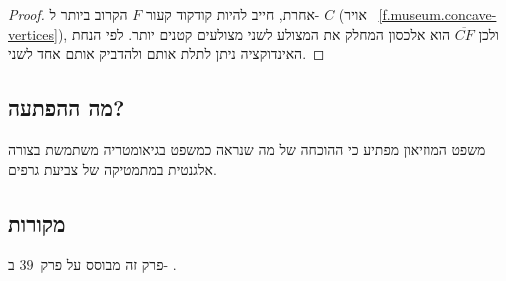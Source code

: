 \begin{proof}
אחרת, חייב להיות קודקוד קעור
$F$
הקרוב ביותר ל-%
$C$
(אויר%
~\ref{f.museum.concave-vertices}),
ולכן
$\overline{CF}$
הוא אלכסון המחלק את המצולע לשני מצולעים קטנים יותר. לפי הנחת האינדוקציה ניתן לתלת אותם ולהדביק אותם אחד לשני.
\end{proof}
%


\subsection*{מה ההפתעה?}
משפט המוזיאון מפתיע כי ההוכחה של מה שנראה כמשפט בגיאומטריה משתמשת בצורה אלגנטית במתמטיקה של צביעת גרפים.

\subsection*{מקורות}

פרק זה מבוסס על פרק~$39$ ב-%
\cite{thebook}.
